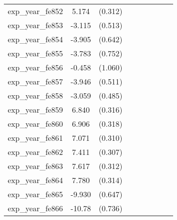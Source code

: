 {\begin{tabular}{l*{4}{cc}}
exp\_year\_fe852&    5.174\sym{***}&  (0.312)&                  &         &                  &         &                  &         \\
exp\_year\_fe853&   -3.115\sym{***}&  (0.513)&                  &         &                  &         &                  &         \\
exp\_year\_fe854&   -3.905\sym{***}&  (0.642)&                  &         &                  &         &                  &         \\
exp\_year\_fe855&   -3.783\sym{***}&  (0.752)&                  &         &                  &         &                  &         \\
exp\_year\_fe856&   -0.458         &  (1.060)&                  &         &                  &         &                  &         \\
exp\_year\_fe857&   -3.946\sym{***}&  (0.511)&                  &         &                  &         &                  &         \\
exp\_year\_fe858&   -3.059\sym{***}&  (0.485)&                  &         &                  &         &                  &         \\
exp\_year\_fe859&    6.840\sym{***}&  (0.316)&                  &         &                  &         &                  &         \\
exp\_year\_fe860&    6.906\sym{***}&  (0.318)&                  &         &                  &         &                  &         \\
exp\_year\_fe861&    7.071\sym{***}&  (0.310)&                  &         &                  &         &                  &         \\
exp\_year\_fe862&    7.411\sym{***}&  (0.307)&                  &         &                  &         &                  &         \\
exp\_year\_fe863&    7.617\sym{***}&  (0.312)&                  &         &                  &         &                  &         \\
exp\_year\_fe864&    7.780\sym{***}&  (0.314)&                  &         &                  &         &                  &         \\
exp\_year\_fe865&   -9.930\sym{***}&  (0.647)&                  &         &                  &         &                  &         \\
exp\_year\_fe866&   -10.78\sym{***}&  (0.736)&                  &         &                  &         &                  &         \\

\end{tabular}}

